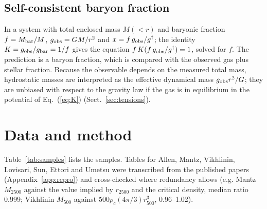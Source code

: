 \documentclass[11pt,a4paper]{article}
\newcommand{\gdag}{g^{\dagger}}
\begin{document}
\subsection{Self-consistent baryon fraction}
In a system with total enclosed mass $M(<r)$ and baryonic fraction $f=M_{\rm bar}/M$, $g_{\rm obs}=GM/r^2$ and $x=f\,g_{\rm obs}/\gdag$; the identity $K=g_{\rm obs}/g_{\rm bar}=1/f$ gives the equation $f\,K(f\,g_{\rm obs}/\gdag)=1$, solved for $f$. The prediction is a baryon fraction, which is compared with the observed gas plus stellar fraction. Because the observable depends on the measured total mass, hydrostatic masses are interpreted as the effective dynamical mass $g_{\rm obs}r^2/G$; they are unbiased with respect to the gravity law if the gas is in equilibrium in the potential of Eq.~(\ref{eq:K}) (Sect.~\ref{sec:tensions}).

\section{Data and method}
\label{sec:data}
Table~\ref{tab:samples} lists the samples. Tables for Allen, Mantz, Vikhlinin, Lovisari, Sun, Ettori and Umetsu were transcribed from the published papers (Appendix~\ref{app:repro}) and cross-checked where redundancy allows (e.g. Mantz $M_{2500}$ against the value implied by $r_{2500}$ and the critical density, median ratio 0.999; Vikhlinin $M_{500}$ against $500\rho_c(4\pi/3)r_{500}^3$, 0.96--1.02).
\end{document}
